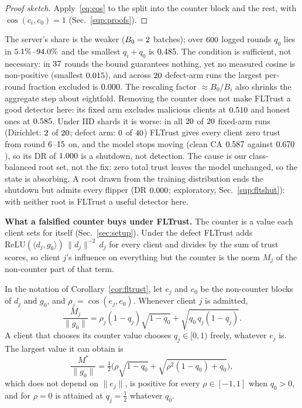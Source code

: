 \documentclass[journal]{IEEEtran}
\begin{document}
\begin{proof}[Proof sketch]
Apply~\eqref{eq:cos} to the split into the counter block and the rest, with
$\cos(c_i,c_0)=1$ (Sec.~\ref{sup:proofs}).
\end{proof}

The server's share is the weaker ($B_0=2$ batches); over $600$ logged rounds $q_0$ lies in
$5.1\%$--$94.0\%$ and the smallest $q_i+q_0$ is $0.485$. The
condition is sufficient, not necessary: in $37$ rounds the bound
guarantees nothing, yet no measured cosine is non-positive (smallest $0.015$),
and across $20$ defect-arm runs the largest per-round fraction excluded is
$0.000$.
The rescaling factor
$\approx B_0/B_i$ also shrinks the aggregate step about eightfold. Removing the
counter does not make FLTrust a good detector here: its fixed arm excludes
malicious clients at $0.510$ and honest ones at
$0.585$. Under IID shards it is worse:
in all $20$ of $20$ fixed-arm runs (Dirichlet:
$2$ of $20$; defect arm: $0$ of $40$) FLTrust gives every
client zero trust from round $6$--$15$ on, and the
model stops moving (clean CA $0.587$ against
$0.670$), so its DR of $1.000$ is a shutdown, not
detection. The cause is our class-balanced root set, not the fix: zero total trust
leaves the model unchanged, so the state is absorbing. A root drawn from the training
distribution ends the shutdown but admits every flipper (DR $0.000$; exploratory,
Sec.~\ref{sup:fltshut}): with neither root is FLTrust a useful detector here.

\textbf{What a falsified counter buys under FLTrust.} The counter is a value each
client sets for itself (Sec.~\ref{sec:setup}). Under the defect FLTrust adds
$\mathrm{ReLU}(\langle d_j,g_0\rangle)\,\|d_j\|^{-2}\,d_j$ for every client and
divides by the sum of trust scores, so client $j$'s influence on everything but
the counter is the norm $M_j$ of the non-counter part of that term.

\begin{corollary}
\label{cor:falsify}
In the notation of Corollary~\ref{cor:fltrust}, let $e_j$ and $e_0$ be the
non-counter blocks of $d_j$ and $g_0$, and $\rho_j=\cos(e_j,e_0)$. Whenever
client $j$ is admitted,
\begin{equation}
\label{eq:mj}
\frac{M_j}{\|g_0\|}=\rho_j(1-q_j)\sqrt{1-q_0}+\sqrt{q_0\,q_j(1-q_j)}.
\end{equation}
A client that chooses its counter value chooses $q_j\in[0,1)$ freely, whatever
$e_j$ is. The largest value it can obtain is
\begin{equation}
\label{eq:mstar}
\frac{M^*}{\|g_0\|}=\tfrac12\Big(\rho\sqrt{1-q_0}+\sqrt{\rho^2(1-q_0)+q_0}\Big),
\end{equation}
which does not depend on $\|e_j\|$, is positive for every $\rho\in[-1,1]$ when
$q_0>0$, and for $\rho=0$ is attained at $q_j=\tfrac12$ whatever $q_0$.
\end{corollary}
\end{document}
